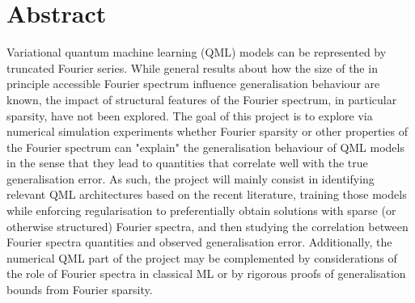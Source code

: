 
\section*{Abstract}

\large{\raggedright
Variational quantum machine learning (QML) models can be represented by truncated Fourier series. While general results about how the size of the in principle accessible Fourier spectrum influence generalisation behaviour are known, the impact of structural features of the Fourier spectrum, in particular sparsity, have not been explored. The goal of this project is to explore via numerical simulation experiments whether Fourier sparsity or other properties of the Fourier spectrum can "explain" the generalisation behaviour of QML models in the sense that they lead to quantities that correlate well with the true generalisation error. As such, the project will mainly consist in identifying relevant QML architectures based on the recent literature, training those models while enforcing regularisation to preferentially obtain solutions with sparse (or otherwise structured) Fourier spectra, and then studying the correlation between Fourier spectra quantities and observed generalisation error. Additionally, the numerical QML part of the project may be complemented by considerations of the role of Fourier spectra in classical ML or by rigorous proofs of generalisation bounds from Fourier sparsity.\\
}


